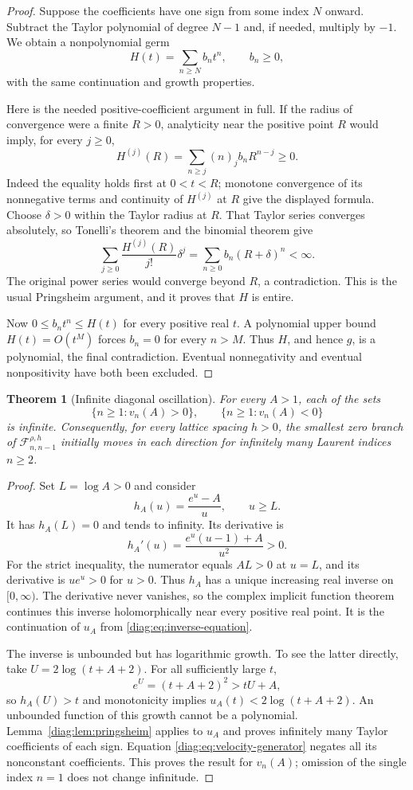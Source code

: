 \documentclass[11pt,a4paper]{article}
\newtheorem{theorem}{Theorem}[section]
\theoremstyle{definition}
\theoremstyle{remark}
\numberwithin{equation}{section}
\begin{document}
\begin{proof}
Suppose the coefficients have one sign from some index $N$ onward.
Subtract the Taylor polynomial of degree $N-1$ and, if needed, multiply
by $-1$.  We obtain a nonpolynomial germ
\[
 H(t)=\sum_{n\geq N}b_n t^n,\qquad b_n\geq0,
\]
with the same continuation and growth properties.

Here is the needed positive-coefficient argument in full.  If the radius
of convergence were a finite $R>0$, analyticity near the positive point
$R$ would imply, for every $j\geq0$,
\[
 H^{(j)}(R)=\sum_{n\geq j}(n)_j b_n R^{n-j}\geq0.
\]
Indeed the equality holds first at $0<t<R$; monotone convergence of its
nonnegative terms and continuity of $H^{(j)}$ at $R$ give the displayed
formula.  Choose $\delta>0$ within the Taylor radius at $R$.  That Taylor
series converges absolutely, so Tonelli's theorem and the binomial theorem
give
\[
 \sum_{j\geq0}\frac{H^{(j)}(R)}{j!}\delta^j
     =\sum_{n\geq0}b_n(R+\delta)^n<\infty.
\]
The original power series would converge beyond $R$, a contradiction.
This is the usual Pringsheim argument, and it proves that $H$ is entire.

Now $0\leq b_n t^n\leq H(t)$ for every positive real $t$.  A polynomial
upper bound $H(t)=O(t^M)$ forces $b_n=0$ for every $n>M$.  Thus $H$, and
hence $g$, is a polynomial, the final contradiction.  Eventual
nonnegativity and eventual nonpositivity have both been excluded.
\end{proof}

\begin{theorem}[Infinite diagonal oscillation]\label{diag:thm:oscillation}
For every $A>1$, each of the sets
\[
 \{n\geq1:v_n(A)>0\},\qquad \{n\geq1:v_n(A)<0\}
\]
is infinite.  Consequently, for every lattice spacing $h>0$, the smallest
zero branch of $\mathscr F_{n,n-1}^{\rho,h}$ initially moves in each
direction for infinitely many Laurent indices $n\geq2$.
\end{theorem}

\begin{proof}
Set $L=\log A>0$ and consider
\[
 h_A(u)=\frac{e^u-A}{u},\qquad u\geq L.
\]
It has $h_A(L)=0$ and tends to infinity.  Its derivative is
\[
 h_A'(u)=\frac{e^u(u-1)+A}{u^2}>0.
\]
For the strict inequality, the numerator equals $AL>0$ at $u=L$, and its
derivative is $ue^u>0$ for $u>0$.  Thus $h_A$ has a unique increasing real
inverse on $[0,\infty)$.  The derivative never vanishes, so the complex
implicit function theorem continues this inverse holomorphically near
every positive real point.  It is the continuation of $u_A$ from
\eqref{diag:eq:inverse-equation}.

The inverse is unbounded but has logarithmic growth.  To see the latter
directly, take $U=2\log(t+A+2)$.  For all sufficiently large $t$,
\[
 e^U=(t+A+2)^2>tU+A,
\]
so $h_A(U)>t$ and monotonicity implies
$u_A(t)<2\log(t+A+2)$.  An unbounded function of this growth cannot be a
polynomial.  Lemma~\ref{diag:lem:pringsheim} applies to $u_A$ and proves
infinitely many Taylor coefficients of each sign.  Equation
\eqref{diag:eq:velocity-generator} negates all its nonconstant
coefficients.  This proves the result for $v_n(A)$; omission of the single
index $n=1$ does not change infinitude.
\end{proof}
\end{document}
